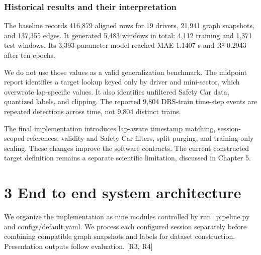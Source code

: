 \documentclass[11pt,a4paper,oneside]{report}
\begin{document}
\subsection*{Historical results and their interpretation}

The baseline records 416,879 aligned rows for 19 drivers, 21,941 graph snapshots, and 137,355 edges. It generated 5,483 windows in total: 4,112 training and 1,371 test windows. Its 3,393-parameter model reached MAE 1.1407 s and R² 0.2943 after ten epochs.

We do not use those values as a valid generalization benchmark. The midpoint report identifies a target lookup keyed only by driver and mini-sector, which overwrote lap-specific values. It also identifies unfiltered Safety Car data, quantized labels, and clipping. The reported 9,804 DRS-train time-step events are repeated detections across time, not 9,804 distinct trains.

The final implementation introduces lap-aware timestamp matching, session-scoped references, validity and Safety Car filters, split purging, and training-only scaling. These changes improve the software contracts. The current constructed target definition remains a separate scientific limitation, discussed in Chapter 5.

\clearpage

\clearpage\chapter*{3 End to end system architecture}

We organize the implementation as nine modules controlled by run\_pipeline.py and configs/default.yaml. We process each configured session separately before combining compatible graph snapshots and labels for dataset construction. Presentation outputs follow evaluation. [R3, R4]

\end{document}
